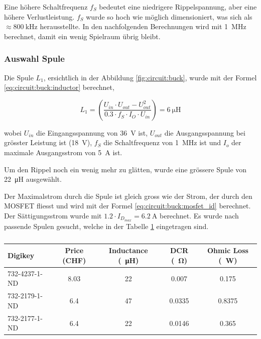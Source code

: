 Eine h\"ohere Schaltfrequenz $f_S$ bedeutet eine niedrigere Rippelspannung, aber
eine h\"ohere Verlustleistung. $f_S$ wurde so hoch wie m\"oglich  dimensioniert,
was sich als $\approx \SI{800}{\kilo\hertz}$ herausstellte. In den nachfolgenden
Berechnungen  wird mit \SI{1}{\mega\hertz} berechnet, damit ein wenig  Spielraum
\"ubrig bleibt.

\subsubsection{Auswahl Spule}

Die Spule $L_1$, ersichtlich in der Abbildung \ref{fig:circuit:buck}, wurde  mit
der Formel \ref{eq:circuit:buck:inductor} berechnet,

\begin{equation}
    L_1 = \left( \frac{U_{in} \cdot U_{out} - U_{out}^2}{0.3 \cdot f_S \cdot I_O \cdot U_{in}} \right) = \SI{6}{\micro\henry}
    \label{eq:circuit:buck:inductor}
\end{equation}

wobei  $U_{in}$  die  Eingangsspannung von  \SI{36}{\volt}  ist,  $U_{out}$  die
Ausgangsspannung  bei  gr\"osster   Leistung  ist  (\SI{18}{\volt}),  $f_S$  die
Schaltfrequenz von  \SI{1}{\mega\hertz} ist und $I_o$ der maximale Ausgangsstrom
von \SI{5}{\ampere} ist.

Um den Rippel  noch ein wenig mehr zu gl\"atten, wurde eine gr\"ossere Spule von
\SI{22}{\micro\henry} ausgew\"ahlt.

Der Maximalstrom durch die Spule ist gleich gross wie  der  Strom, der durch den
MOSFET   fliesst   und   wird  mit  der  Formel  \ref{eq:circuit:buck:mosfet_id}
berechnet.  Der  S\"attigungsstrom   wurde   mit   $1.2   \cdot   I_{D_{max}}  =
\SI{6.2}{\ampere}$ berechnet. Es  wurde  nach passende Spulen gesucht, welche in
der Tabelle \ref{tab:circuit:buck:inductor} eingetragen sind.

\begin{table}[th!]
    \begin{center}
        \caption{}
        \label{tab:circuit:buck:inductor}
        \begin{tabular}{lcccc}
            \toprule
            Digikey         & Price (CHF) & Inductance (\SI{}{\micro\henry}) & DCR (\SI{}{\ohm}) & Ohmic Loss (\SI{}{\watt}) \\
            \midrule
            \rowcolor{lightgray}
            732-4237-1-ND   & 8.03        & 22                               & 0.007             & 0.175  \\
            732-2179-1-ND   & 6.4         & 47                               & 0.0335            & 0.8375 \\
            732-2177-1-ND   & 6.4         & 22                               & 0.0146            & 0.365  \\
            \bottomrule
        \end{tabular}
    \end{center}
\end{table}

